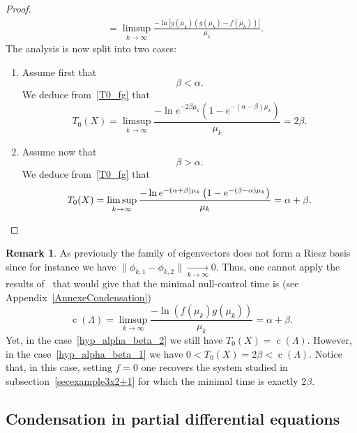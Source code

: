 \documentclass[10pt]{amsart}
\theoremstyle{definition}\newtheorem{defi}[theo]{Definition}\newtheorem{rema}[theo]{Remark}\newtheorem{exam}[theo]{Example}\newtheorem{exem}[theo]{Example}\newtheorem{nota}[theo]{Notation}
\DeclareMathOperator{\cond}{c}
\begin{document}
\begin{proof}
\begin{equation}
\begin{aligned}
&= \limsup_{k \to \infty} \frac{ -\ln \left| g(\mu_k) (g(\mu_k) - f(\mu_k)) \right| }{\mu_k}.
\end{aligned}
\end{equation}
The analysis is now split into two cases:
\begin{enumerate}
\item \label{list-pr-prop5.7.1}Assume first that
\begin{equation}\label{hyp_alpha_beta_1}
\beta < \alpha.
\end{equation}
We deduce from~\eqref{T0_fg} that
\[
T_0(X) = \limsup_{k \to \infty} \frac{ -\ln e^{-2\beta \mu_k} \left(1- e^{-(\alpha-\beta) \mu_k} \right) }{\mu_k} = 2 \beta.
\]
\item \label{list-pr-prop5.7.2}Assume now that
\begin{equation}\label{hyp_alpha_beta_2}
\beta > \alpha.
\end{equation}
We deduce from~\eqref{T0_fg} that
\[
T_0(X) = \limsup_{k \to \infty} \frac{ -\ln e^{-(\alpha+\beta) \mu_k} \left(1- e^{-(\beta-\alpha) \mu_k} \right) }{\mu_k} = \alpha + \beta.\qedhere
\]
\end{enumerate}
\end{proof}



\begin{rema}
As previously the family of eigenvectors does not form a Riesz basis since for instance we have $\| \phi_{k,1} - \phi_{k,2} \| \underset{k \to \infty}{\longrightarrow} 0$. Thus, one cannot apply the results of~\cite{AmmarKhodjaBenabdallahGonzalez-BurgosdeTeresa:2014} that would give that the minimal null-control time is (see Appendix~\ref{AnnexeCondensation})
\[
\cond(\Lambda)=\limsup_{k \to \infty} \frac{-\ln \left(f(\mu_k)g(\mu_k)\right)}{\mu_k} = \alpha + \beta.
\]
Yet, in the case~\eqref{hyp_alpha_beta_2} we still have $T_0(X)=\cond(\Lambda)$. However, in the case~\eqref{hyp_alpha_beta_1} we have $0<T_0(X) = 2 \beta < \cond(\Lambda)$. Notice that, in this case, setting $f=0$ one recovers the system studied in subsection~\ref{secexample3x2+1} for which the minimal time is exactly $2\beta$.
\end{rema}



\subsection{Condensation in partial differential equations} \label{Subsec:ExemplesEDP}
\end{document}
